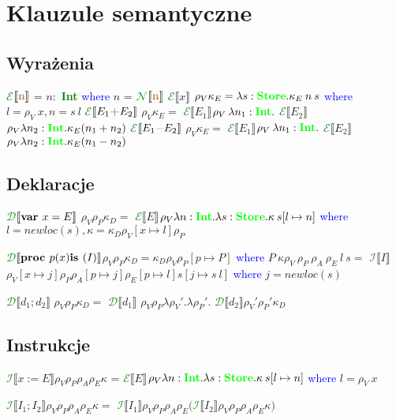 \documentclass{article}
\newcommand{\br}[1]{\textcolor{brown}{\textbf{#1}}}
\newcommand{\gr}[1]{\textcolor{green}{\textbf{#1}}}
\newcommand{\bl}[1]{\textcolor{blue}{#1}}
\newcommand{\n}{\newline}
\newcommand{\bd}[1]{\mbox{\bf#1}}
\newcommand{\lc}[1]{\textcolor{green}{$\mathcal{#1}$}}
\newcommand{\db}[1]{$\llbracket#1\rrbracket$}
\begin{document}
\newpage 

\section*{Klauzule semantyczne}
\subsection*{Wyrażenia}
\lc{E}\db{\br{n}} = $n:$ \gr{Int} \bl{where} $n$ = \lc{N}\db{\br{n}} \n
\lc{E}\db{x} $\rho_V \kappa_E = \lambda s:\gr{Store}.\kappa_E\:n\:s$ \bl{where} $l = \rho_V\:x,n = s\:l$ \n
\lc{E}\db{E_1 \br{+} E_2} $\rho_V \kappa_E =$ \lc{E}\db{E_1}$\rho_V \:\lambda n_1:\gr{Int}.$ \lc{E}\db{E_2}$\rho_V \lambda n_2:\gr{Int}.\kappa_E(n_1+n_2)$ \n
\lc{E}\db{E_1 \br{$-$} E_2} $\rho_V \kappa_E =$ \lc{E}\db{E_1}$\rho_V \:\lambda n_1:\gr{Int}.$ \lc{E}\db{E_2}$\rho_V \lambda n_2:\gr{Int}.\kappa_E(n_1-n_2)$ \n

\subsection*{Deklaracje}
\lc{D}\db{\bd{var } x = E} $\rho_V \rho_P \kappa_D =$ \lc{E}\db{E}$\rho_V \lambda n:\gr{Int}.\lambda s:\gr{Store}. \kappa \:s[l\mapsto n]$\n 
\hspace*{12em}\bl{where} $l = newloc(s), \kappa = \kappa_D \rho_V[x\mapsto l] \rho_P$

\lc{D}\db{\bd{proc } p(x) \bd{ is } (I)}$\rho_V \rho_P \kappa_D = \kappa_D \rho_V \rho_P[p \mapsto P]$\n
\hspace*{8em} \bl{where} $P \:\kappa \rho_V \: \rho_P \: \rho_A \: \rho_E \: l \: s =$ \lc{I}\db{I} $\rho_V[x\mapsto j] \rho_P \rho_A[p \mapsto j] \rho_E[p \mapsto l] s[j \mapsto s\:l]$ \bl{where} $j=newloc(s)$

\lc{D}\db{d_1;d_2} $\rho_V \rho_P \kappa_D =$ \lc{D}\db{d_1} $\rho_V \rho_P \lambda \rho_V'.\lambda \rho_P'.$ \lc{D}\db{d_2}$\rho_V' \rho_P' \kappa_D$

\subsection*{Instrukcje}
\lc{I}\db{x:=E}$\rho_V \rho_P \rho_A \rho_E \kappa$ = \lc{E}\db{E}$\rho_V \lambda n:\gr{Int}.\lambda s:\gr{Store}.\kappa \:s[l \mapsto n]$ \bl{where} $l = \rho_V \:x$

\lc{I}\db{I_1;I_2}$\rho_V \rho_P \rho_A \rho_E \kappa =$ \lc{I}\db{I_1}$\rho_V \rho_P \rho_A \rho_E($\lc{I}\db{I_2}$\rho_V \rho_P \rho_A \rho_E \kappa)$
\end{document}
